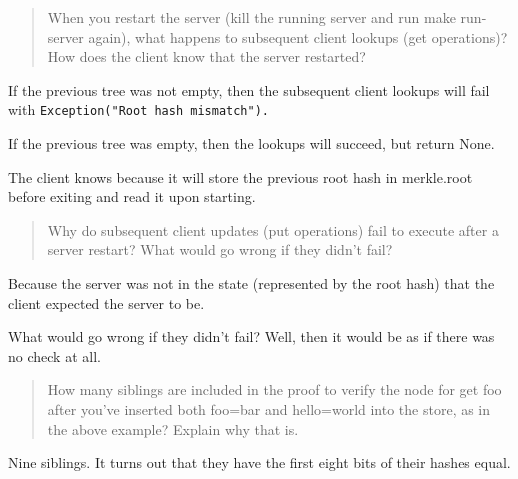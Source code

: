 \documentclass{article}
\begin{document}
\begin{quotation}
When you restart the server (kill the running server and run make run-server
again), what happens to subsequent client lookups (get operations)? How does the
client know that the server restarted?
\end{quotation}
If the previous tree was not empty, then the subsequent client lookups will fail
with \texttt{Exception("Root hash mismatch").}

If the previous tree was empty, then the lookups will succeed, but return None.

The client knows because it will store the previous root hash in merkle.root
before exiting and read it upon starting.

\begin{quotation}
Why do subsequent client updates (put operations) fail to execute after a server
restart? What would go wrong if they didn’t fail?
\end{quotation}
Because the server was not in the state (represented by the root hash) that the
client expected the server to be.

What would go wrong if they didn't fail? Well, then it would be as if there was
no check at all.


\begin{quotation}
How many siblings are included in the proof to verify the node for get foo after
you’ve inserted both foo=bar and hello=world into the store, as in the above
example? Explain why that is.
\end{quotation}
Nine siblings. It turns out that they have the first eight bits of their hashes
equal.
\end{document}
